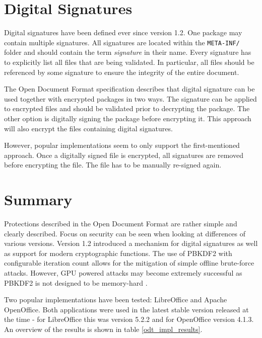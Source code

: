 \documentclass[11pt,oneside]{fithesis2}
\begin{document}
\section{Digital Signatures}

Digital signatures have been defined ever since version 1.2. One package may contain multiple signatures. All signatures are located within the \texttt{META-INF/} folder and should contain the term \textit{signature} in their name. Every signature has to explicitly list all files that are being validated. In particular, all files should be referenced by some signature to ensure the integrity of the entire document.

The Open Document Format specification describes that digital signature can be used together with encrypted packages in two ways. The signature can be applied to encrypted files and should be validated prior to decrypting the package. The other option is digitally signing the package before encrypting it. This approach will also encrypt the files containing digital signatures.  

However, popular implementations seem to only support the first-mentioned approach. Once a digitally signed file is encrypted, all signatures are removed before encrypting the file. The file has to be manually re-signed again.

\section{Summary}

Protections described in the Open Document Format are rather simple and clearly described. Focus on security can be seen when looking at differences of various versions. Version 1.2 introduced a mechanism for digital signatures as well as support for modern cryptographic functions. The use of PBKDF2 with configurable iteration count allows for the mitigation of simple offline brute-force attacks. However, GPU powered attacks may become extremely successful as PBKDF2 is not designed to be memory-hard \cite{PBKDF2_attack}.

Two popular implementations have been tested: LibreOffice and Apache OpenOffice. Both applications were used in the latest stable version released at the time - for LibreOffice this was version 5.2.2 and for OpenOffice version 4.1.3. An overview of the results is shown in table \ref{odt_impl_results}.
\end{document}
